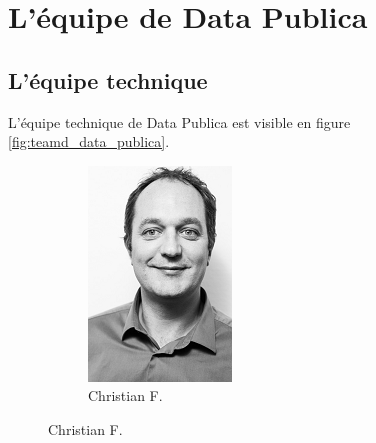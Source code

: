 \section{L'équipe de Data Publica}
    \subsection{L'équipe technique}
    \label{annexe:teamd_data_publica}
        L'équipe technique de Data Publica est visible en figure \ref{fig:teamd_data_publica}.
        \begin{figure}[h!]
            \centering
            \begin{subfigure}[b]{0.2\textwidth}
                \includegraphics[width=\textwidth]{images/christian-serieux.png}
                \caption{Christian F.}

\end{subfigure}
\end{figure}
